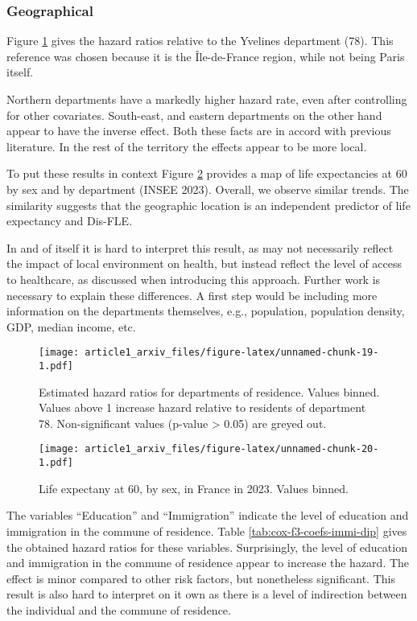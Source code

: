 \documentclass{article}
\begin{document}
\hypertarget{geographical}{%
\subsubsection{Geographical}\label{geographical}}

Figure \ref{fig:cox-f3-coefs-dep} gives the hazard ratios relative to
the Yvelines department (78). This reference was chosen because it is
the Île-de-France region, while not being Paris itself.

Northern departments have a markedly higher hazard rate, even after
controlling for other covariates. South-east, and eastern departments on
the other hand appear to have the inverse effect. Both these facts are
in accord with previous literature. In the rest of the territory the
effects appear to be more local.

To put these results in context Figure \ref{fig:insee-le-dep} provides a
map of life expectancies at 60 by sex and by department (INSEE 2023).
Overall, we observe similar trends. The similarity suggests that the
geographic location is an independent predictor of life expectancy and
Dis-FLE.

In and of itself it is hard to interpret this result, as may not
necessarily reflect the impact of local environment on health, but
instead reflect the level of access to healthcare, as discussed when
introducing this approach. Further work is necessary to explain these
differences. A first step would be including more information on the
departments themselves, e.g., population, population density, GDP,
median income, etc.

\begin{figure}
\centering
\texttt{[image: article1\_arxiv\_files/figure-latex/unnamed-chunk-19-1.pdf]}
\caption{\label{fig:cox-f3-coefs-dep} Estimated hazard ratios for
departments of residence. Values binned. Values above 1 increase hazard
relative to residents of department 78. Non-significant values (p-value
\textgreater{} 0.05) are greyed out.}
\end{figure}

\begin{figure}
\centering
\texttt{[image: article1\_arxiv\_files/figure-latex/unnamed-chunk-20-1.pdf]}
\caption{\label{fig:insee-le-dep} Life expectany at 60, by sex, in
France in 2023. Values binned.}
\end{figure}

The variables ``Education'' and ``Immigration'' indicate the level of
education and immigration in the commune of residence. Table
\ref{tab:cox-f3-coefs-immi-dip} gives the obtained hazard ratios for
these variables. Surprisingly, the level of education and immigration in
the commune of residence appear to increase the hazard. The effect is
minor compared to other risk factors, but nonetheless significant. This
result is also hard to interpret on it own as there is a level of
indirection between the individual and the commune of residence.
\end{document}
